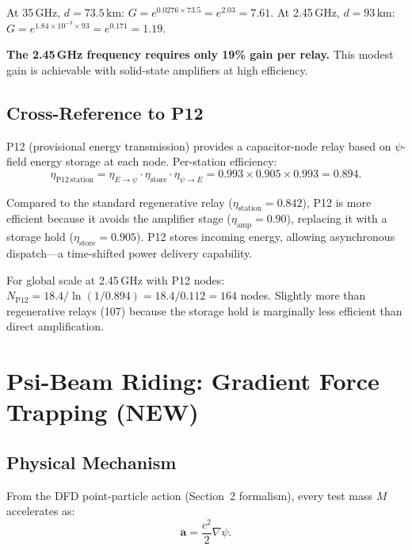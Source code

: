 \documentclass[aps,prd,twocolumn,superscriptaddress]{revtex4-2}
\begin{document}
At 35\,GHz, $d = 73.5\,\mathrm{km}$: $G = e^{0.0276\times73.5} = e^{2.03} = 7.61$.
At 2.45\,GHz, $d = 93\,\mathrm{km}$: $G = e^{1.84\times10^{-3}\times93} = e^{0.171} = 1.19$.

\textbf{The 2.45\,GHz frequency requires only 19\% gain per relay.}
This modest gain is achievable with solid-state amplifiers at high efficiency.

\subsection{Cross-Reference to P12}

P12 (provisional energy transmission) provides a capacitor-node relay
based on $\psi$-field energy storage at each node.  Per-station efficiency:
\begin{equation}
\eta_\mathrm{P12\,station} = \eta_{E\to\psi}\cdot\eta_\mathrm{store}\cdot\eta_{\psi\to E}
= 0.993\times0.905\times0.993 = 0.894.
\end{equation}

Compared to the standard regenerative relay ($\eta_\mathrm{station} = 0.842$),
P12 is more efficient because it avoids the amplifier stage
($\eta_\mathrm{amp} = 0.90$), replacing it with a storage hold
($\eta_\mathrm{store} = 0.905$).  P12 stores incoming energy, allowing
asynchronous dispatch---a time-shifted power delivery capability.

For global scale at 2.45\,GHz with P12 nodes:
$N_\mathrm{P12} = 18.4/\ln(1/0.894) = 18.4/0.112 = 164$ nodes.
Slightly more than regenerative relays (107) because the storage hold
is marginally less efficient than direct amplification.

\section{Psi-Beam Riding: Gradient Force Trapping (NEW)}
\label{sec:beam_riding}

\subsection{Physical Mechanism}

From the DFD point-particle action (Section~2 formalism), every
test mass $M$ accelerates as:
\begin{equation}
\mathbf{a} = \frac{c^2}{2}\nabla\psi.
\label{eq:dfd_eom}
\end{equation}
\end{document}

